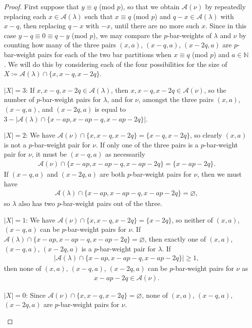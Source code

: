 \documentclass[10pt]{amsart}
\begin{document}
\begin{proof}
First suppose that $y\equiv q$ (mod $p$), so that we obtain $\mathcal{A}(\nu)$ by repeatedly replacing each $x\in\mathcal{A}(\lambda)$ such that $x\equiv q$ (mod $p$) and $q-x\in\mathcal{A}(\lambda)$ with $x-q$, then replacing $q-x$ with $-x$, until there are no more such $x$. Since in this case $y-q\equiv0\equiv q-y$ (mod $p$), we may compare the $p$-bar-weights of $\lambda$ and $\nu$ by counting how many of the three pairs $(x,a)$, $(x-q,a)$, $(x-2q,a)$ are $p$-bar-weight pairs for each of the two bar partitions when $x\equiv q$ (mod $p$) and $a\in\mathbb{N}$. We will do this by considering each of the four possibilities for the size of $X\coloneqq\mathcal{A}(\lambda)\cap\{x,x-q,x-2q\}$. 
\begin{flushleft}
$|X|=3$: If $x,x-q,x-2q\in\mathcal{A}(\lambda)$, then $x,x-q,x-2q\in\mathcal{A}(\nu)$, so the number of $p$-bar-weight pairs for $\lambda$, and for $\nu$, amongst the three pairs $(x,a)$, $(x-q,a)$, and $(x-2q,a)$ is equal to $3-|\mathcal{A}(\lambda)\cap\{x-ap,x-ap-q,x-ap-2q\}|$. 
\end{flushleft}
\begin{flushleft}
$|X|=2$: We have $\mathcal{A}(\nu)\cap\{x,x-q,x-2q\}=\{x-q,x-2q\}$, so clearly $(x,a)$ is not a $p$-bar-weight pair for $\nu$. If only one of the three pairs is a $p$-bar-weight pair for $\nu$, it must be $(x-q,a)$ as necessarily 
\begin{align*}
\mathcal{A}(\nu)\cap\{x-ap,x-ap-q,x-ap-2q\}=\{x-ap-2q\}.
\end{align*}
If $(x-q,a)$ and $(x-2q,a)$ are both $p$-bar-weight pairs for $\nu$, then we must have 
\begin{align*}
\mathcal{A}(\lambda)\cap\{x-ap,x-ap-q,x-ap-2q\}=\varnothing,\end{align*} 
so $\lambda$ also has two $p$-bar-weight pairs out of the three.
\end{flushleft}
\begin{flushleft}
$|X|=1$: We have $\mathcal{A}(\nu)\cap\{x,x-q,x-2q\}=\{x-2q\}$, so neither of $(x,a)$, $(x-q,a)$ can be $p$-bar-weight pairs for $\nu$. If $\mathcal{A}(\lambda)\cap\{x-ap,x-ap-q,x-ap-2q\}=\varnothing$, then exactly one of $(x,a)$, $(x-q,a)$, $(x-2q,a)$ is a $p$-bar-weight pair for $\lambda$. If 
\begin{align*}
|\mathcal{A}(\lambda)\cap\{x-ap,x-ap-q,x-ap-2q\}|\geq1,
\end{align*} 
then none of $(x,a)$, $(x-q,a)$, $(x-2q,a)$ can be $p$-bar-weight pairs for $\nu$ as 
\begin{align*}x-ap-2q\in\mathcal{A}(\nu). 
\end{align*}
\end{flushleft}
\begin{flushleft}
$|X|=0$: Since $\mathcal{A}(\nu)\cap\{x,x-q,x-2q\}=\varnothing$, none of $(x,a)$, $(x-q,a)$, $(x-2q,a)$ are $p$-bar-weight pairs for $\nu$. 
\end{flushleft}


\end{proof}
\end{document}
